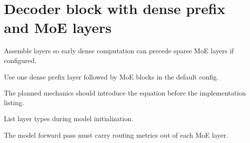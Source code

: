 \section{Decoder block with dense prefix and MoE layers}
\label{sec:ch10-decoder-block-with-dense-prefix-and-moe-layers}

Assemble layers so early dense computation can precede sparse MoE layers if configured.



Use one dense prefix layer followed by MoE blocks in the default config.



The planned mechanics should introduce the equation before the implementation listing.





\begin{checkpointbox}
List layer types during model initialization.
\end{checkpointbox}

The model forward pass must carry routing metrics out of each MoE layer.
